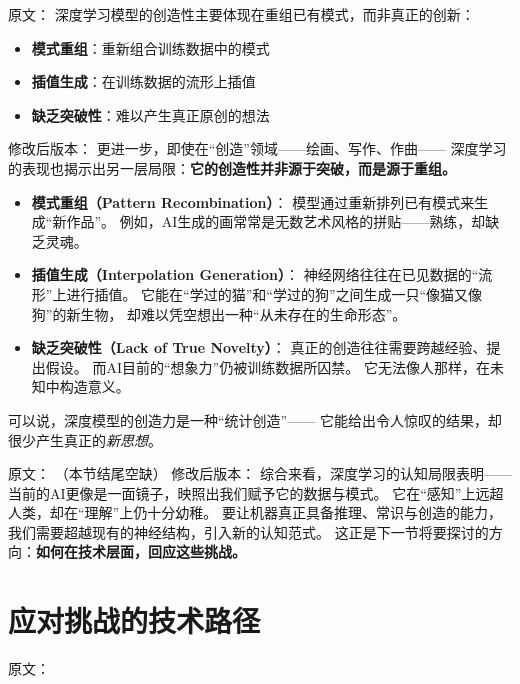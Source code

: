 原文：
深度学习模型的创造性主要体现在重组已有模式，而非真正的创新：
\begin{itemize}
\item \textbf{模式重组}：重新组合训练数据中的模式
\item \textbf{插值生成}：在训练数据的流形上插值
\item \textbf{缺乏突破性}：难以产生真正原创的想法
\end{itemize}
修改后版本：
更进一步，即使在“创造”领域——绘画、写作、作曲——  
深度学习的表现也揭示出另一层局限：\textbf{它的创造性并非源于突破，而是源于重组。}  

\begin{itemize}
\item \textbf{模式重组（Pattern Recombination）}：  
  模型通过重新排列已有模式来生成“新作品”。  
  例如，AI生成的画常常是无数艺术风格的拼贴——熟练，却缺乏灵魂。  

\item \textbf{插值生成（Interpolation Generation）}：  
  神经网络往往在已见数据的“流形”上进行插值。  
  它能在“学过的猫”和“学过的狗”之间生成一只“像猫又像狗”的新生物，  
  却难以凭空想出一种“从未存在的生命形态”。  

\item \textbf{缺乏突破性（Lack of True Novelty）}：  
  真正的创造往往需要跨越经验、提出假设。  
  而AI目前的“想象力”仍被训练数据所囚禁。  
  它无法像人那样，在未知中构造意义。  
\end{itemize}
可以说，深度模型的创造力是一种“统计创造”——  
它能给出令人惊叹的结果，却很少产生真正的\textit{新思想}。



原文：
（本节结尾空缺）
修改后版本：
综合来看，深度学习的认知局限表明——  
当前的AI更像是一面镜子，映照出我们赋予它的数据与模式。  
它在“感知”上远超人类，却在“理解”上仍十分幼稚。  
要让机器真正具备推理、常识与创造的能力，  
我们需要超越现有的神经结构，引入新的认知范式。  
这正是下一节将要探讨的方向：\textbf{如何在技术层面，回应这些挑战。}

\section{应对挑战的技术路径}

原文：
